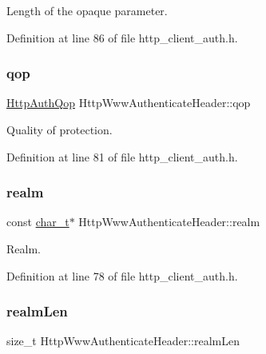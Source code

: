 Length of the opaque parameter. 



Definition at line 86 of file http\+\_\+client\+\_\+auth.\+h.

\mbox{\label{structHttpWwwAuthenticateHeader_a9b039c3e85d0142f4a336ba085581d83}} 
\subsubsection{\texorpdfstring{qop}{qop}}
{\footnotesize\ttfamily \hyperlink{http__common_8h_add2473701f02b0e633970b91bebf92b0}{Http\+Auth\+Qop} Http\+Www\+Authenticate\+Header\+::qop}



Quality of protection. 



Definition at line 81 of file http\+\_\+client\+\_\+auth.\+h.

\mbox{\label{structHttpWwwAuthenticateHeader_a8d516fa140d7d8f839a3877aa207c46c}} 
\subsubsection{\texorpdfstring{realm}{realm}}
{\footnotesize\ttfamily const \hyperlink{compiler__port_8h_a40bb5262bf908c328fbcfbe5d29d0201}{char\+\_\+t}$\ast$ Http\+Www\+Authenticate\+Header\+::realm}



Realm. 



Definition at line 78 of file http\+\_\+client\+\_\+auth.\+h.

\mbox{\label{structHttpWwwAuthenticateHeader_a7645656f51f2ea4df183446e42442f6e}} 
\subsubsection{\texorpdfstring{realm\+Len}{realmLen}}
{\footnotesize\ttfamily size\+\_\+t Http\+Www\+Authenticate\+Header\+::realm\+Len}



